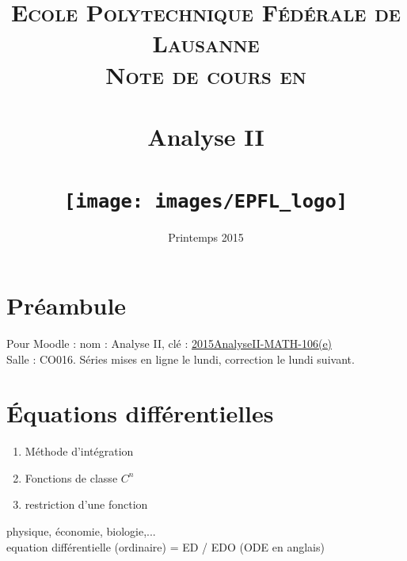 \documentclass[12pt,a4paper]{article}
\date{Printemps 2015}
\title{	
\normalfont \normalsize 
\textsc{Ecole Polytechnique Fédérale de Lausanne} \\ [25pt] %
\textsc{Note de cours en }\\ [0pt] %
\horrule{0.5pt} \\[0.4cm] %
\huge Analyse II\\ %
\horrule{2pt} \\[0.5cm] %
\texttt{[image: images/EPFL\_logo]}}
\begin{document}
\maketitle
\newpage
\tableofcontents
{}
\section*{Préambule}
Pour Moodle : nom : Analyse II, clé : \underline{2015AnalyseII-MATH-106(e)}\\
Salle : CO016. Séries mises en ligne le lundi, correction le lundi suivant.
\section{Équations différentielles}
\begin{enumerate}
	\item Méthode d'intégration
	\item Fonctions de classe $C^n$
	\item restriction d'une fonction
\end{enumerate}
 physique, économie, biologie,...\\
 equation différentielle (ordinaire) = ED / EDO (ODE en anglais)
\end{document}
